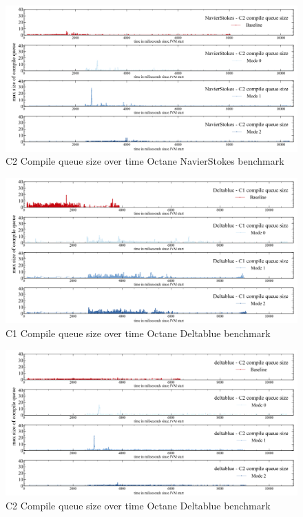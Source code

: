 \begin{figure}[ht]
  \begin{center}
    \centering
    \includegraphics[width=1.0\textwidth]{figures/octane_queue_navierstokes_separate_c2.png}
    \caption{C2 Compile queue size over time Octane NavierStokes benchmark}
    \label{f:octane_queue_navierstokes_separate_c2}
  \end{center}
\end{figure}
\begin{figure}[ht]
  \begin{center}
    \centering
    \includegraphics[width=1.0\textwidth]{figures/octane_queue_deltablue_separate_c1.png}
    \caption{C1 Compile queue size over time Octane Deltablue benchmark}
    \label{f:octane_queue_deltablue_separate_c1}
  \end{center}
\end{figure}
\begin{figure}[ht]
  \begin{center}
    \centering
    \includegraphics[width=1.0\textwidth]{figures/octane_queue_deltablue_separate_c2.png}
    \caption{C2 Compile queue size over time Octane Deltablue benchmark}
    \label{f:octane_queue_deltablue_separate_c2}
  \end{center}
\end{figure}
